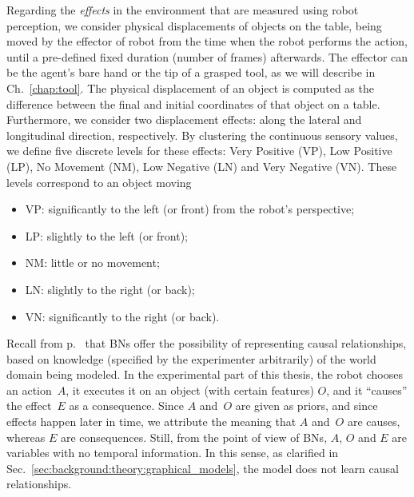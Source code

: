 Regarding the \emph{effects} in the environment that are measured using robot perception, we consider physical displacements of objects on the table, being moved by the effector of robot from the time when the robot performs the action, until a pre-defined fixed duration (number of frames) afterwards. \label{para:effects}
The effector can be the agent's bare hand or the tip of a grasped tool, as we will describe in Ch.~\ref{chap:tool}.
The physical displacement of an object is computed as the difference between the final and initial coordinates of that object on a table.
Furthermore, we consider two displacement effects: along the lateral and longitudinal direction, respectively.
By clustering the continuous sensory values, we define five discrete levels for these effects: Very Positive (VP), Low Positive (LP), No Movement (NM), Low Negative (LN) and Very Negative (VN).
These levels correspond to an object moving
\begin{itemize}
\item VP: significantly to the left (or front) from the robot's perspective;

\item LP: slightly to the left (or front);

\item NM: little or no movement;

\item LN: slightly to the right (or back);

\item VN: significantly to the right (or back).
\end{itemize}

Recall from p.~\pageref{para:BN_causality_clarification} that \acp{BN} offer the possibility of representing causal relationships, based on knowledge (specified by the experimenter arbitrarily) of the world domain being modeled.
In the experimental part of this thesis, the robot chooses an action~$A$, it executes it on an object (with certain features) $O$, and it ``causes'' the effect~$E$ as a consequence.
Since $A$ and~$O$ are given as priors, and since effects happen later in time, we attribute the meaning that $A$ and~$O$ are causes, whereas $E$ are consequences.
Still, from the point of view of \acp{BN}, $A$, $O$ and $E$ are variables with no temporal information.
In this sense, as clarified in Sec.~\ref{sec:background:theory:graphical_models}, the model does not learn causal relationships.

